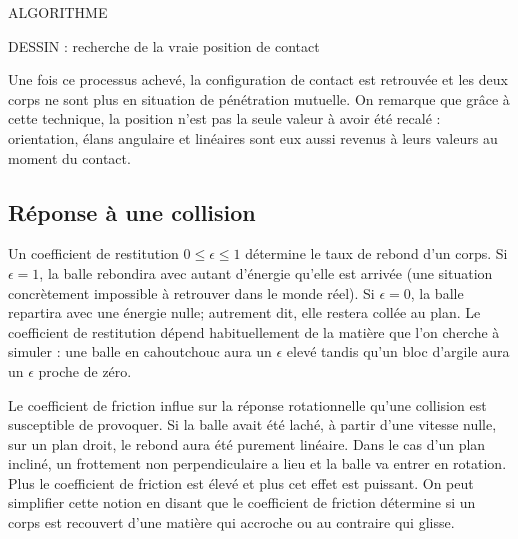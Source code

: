 ALGORITHME

DESSIN : recherche de la vraie position de contact

Une fois ce processus achevé, la configuration de contact est retrouvée et les deux corps ne sont plus en situation de pénétration mutuelle. On remarque que grâce à cette technique, la position n'est pas la seule valeur à avoir été recalé : orientation, élans angulaire et linéaires sont eux aussi revenus à leurs valeurs au moment du contact.

\subsection{Réponse à une collision}

Un coefficient de restitution $0 \leq \epsilon \leq 1$ détermine le taux de rebond d'un corps. Si $\epsilon = 1$, la balle rebondira avec autant d'énergie qu'elle est arrivée (une situation concrètement impossible à retrouver dans le monde réel). Si $\epsilon = 0$, la balle repartira avec une énergie nulle; autrement dit, elle restera collée au plan. Le coefficient de restitution dépend habituellement de la matière que l'on cherche à simuler : une balle en cahoutchouc aura un $\epsilon$ elevé tandis qu'un bloc d'argile aura un $\epsilon$ proche de zéro.

Le coefficient de friction influe sur la réponse rotationnelle qu'une collision est susceptible de provoquer. Si la balle avait été laché, à partir d'une vitesse nulle, sur un plan droit, le rebond aura été purement linéaire. Dans le cas d'un plan incliné, un frottement non perpendiculaire a lieu et la balle va entrer en rotation. Plus le coefficient de friction est élevé et plus cet effet est puissant. On peut simplifier cette notion en disant que le coefficient de friction détermine si un corps est recouvert d'une matière qui accroche ou au contraire qui glisse.

